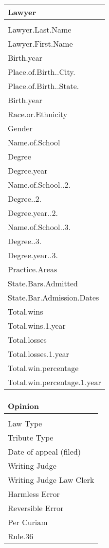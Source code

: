 \documentclass{article} %
\begin{document}
\begin{multicols}{2}
\begin{tabular}{l}
\bf{Lawyer}\\ 
\hline \\
Lawyer.Last.Name\\
Lawyer.First.Name\\
Birth.year\\
Place.of.Birth..City.\\
Place.of.Birth..State.\\
Birth.year\\
Race.or.Ethnicity\\
Gender\\
Name.of.School\\
Degree\\
Degree.year\\
Name.of.School..2.\\
Degree..2.\\
Degree.year..2.\\
Name.of.School..3.\\
Degree..3.\\
Degree.year..3.\\
Practice.Areas\\
State.Bars.Admitted\\
State.Bar.Admission.Dates\\
Total.wins\\
Total.wins.1.year\\
Total.losses\\
Total.losses.1.year\\
Total.win.percentage\\ %
Total.win.percentage.1.year\\ %
\end{tabular}

\pagebreak
\begin{tabular}{l}
\bf{Opinion}\\ 
\hline \\
Law Type\\
Tribute Type\\
Date of appeal (filed)\\
Writing Judge\\
Writing Judge Law Clerk\\
Harmless Error\\
Reversible Error\\
Per Curiam\\
Rule.36\\
\end{tabular}


\end{multicols}
\end{document}
